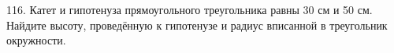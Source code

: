 116. Катет и гипотенуза прямоугольного треугольника равны 30 см и 50 см. Найдите высоту, проведённую к гипотенузе и радиус вписанной в треугольник окружности.\\
